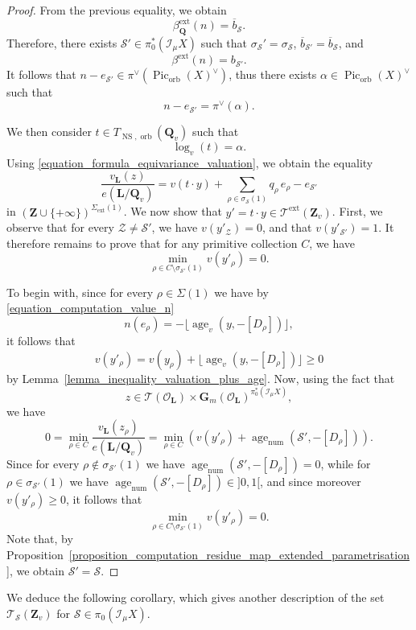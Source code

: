 \documentclass{proc-l}
\newcommand{\Z}{\mathbf{Z}}
\newcommand{\Q}{\mathbf{Q}}
\newcommand{\Le}{\mathbf{L}}
\newcommand{\G}{\mathbf{G}}
\DeclareMathOperator{\Pic}{Pic}
\DeclareMathOperator{\num}{num}
\DeclareMathOperator{\age}{age}
\DeclareMathOperator{\NS}{NS}
\DeclareMathOperator{\orb}{orb}
\DeclareMathOperator{\ext}{ext}
\newcommand{\stackZ}{\mathcal{Z}}
\newcommand{\stackS}{\mathcal{S}}
\newcommand{\stackT}{\mathcal{T}}
\newcommand{\sheafI}{\mathcal{I}}
\newcommand{\sheafO}{\mathcal{O}}
\newcommand{\sector}{\pi_0(\sheafI_{\mu} X)}
\newcommand{\twistsector}{\pi_0^*(\sheafI_{\mu} X)}
\theoremstyle{definition}
\theoremstyle{remark}
\numberwithin{equation}{section}
\begin{document}
\begin{proof}
From the previous equality, we obtain
\[
\beta^{\ext}_{\Q}(n) = \overline b_{\stackS}.
\]
Therefore, there exists $\stackS' \in \twistsector$ such that
$\sigma_\stackS' = \sigma_\stackS$,
$\overline b_{\stackS'} = \overline b_{\stackS}$, and
\[
\beta^{\ext}(n) = b_{\stackS'}.
\]
It follows that $n - e_{\stackS'} \in \pi^{\vee}\left(\Pic_{\orb}(X)^{\vee}\right)$, thus there exists $\alpha \in \Pic_{\orb}(X)^{\vee}$ such that
\[
n - e_{\stackS'} = \pi^{\vee}\left(\alpha\right).
\]

We then consider $t \in T_{\NS,\orb}(\Q_v)$ such that
\[
\log_v(t) = \alpha.
\]
Using \eqref{equation_formula_equivariance_valuation}, we obtain the equality
\[
\frac{v_{\Le}(z)}{e(\Le/\Q_v)}
=
v(t \cdot y)
+
\sum_{\rho \in \sigma_\stackS(1)} q_{\rho}\, e_{\rho}
-
e_{\stackS'}
\]
in $\left( \Z \cup \{+\infty\} \right)^{\Sigma_{\ext}(1)}$. We now show that $y' = t \cdot y \in \stackT^{\ext}(\Z_v)$. First, we observe that for
every $\stackZ \neq \stackS'$, we have $v(y'_{\stackZ}) = 0$, and that
$v(y'_{\stackS'}) = 1$. It therefore remains to prove that for any primitive
collection $C$, we have
\[
\min_{\rho \in C \setminus \sigma_{\stackS'}(1)} v(y'_{\rho}) = 0 .
\]

To begin with, since for every $\rho \in \Sigma(1)$ we have by \eqref{equation_computation_value_n}
\[
n(e_{\rho}) = - \lfloor \age_v(y,-[D_{\rho}]) \rfloor,
\]
it follows that
\[
v(y'_{\rho})
=
v(y_{\rho}) + \lfloor \age_v(y,-[D_{\rho}]) \rfloor
\geqslant 0
\]
by Lemma~\ref{lemma_inequality_valuation_plus_age}. Now, using the fact that
\[
z \in \stackT(\sheafO_{\Le}) \times \G_m(\sheafO_{\Le})^{\twistsector},
\]
we have
\[
0
=
\min_{\rho \in C}
\frac{v_{\Le}(z_{\rho})}{e(\Le/\Q_v)}
=
\min_{\rho \in C}
\left(
v(y'_{\rho}) + \age_{\num}\!\left(\stackS',-[D_{\rho}]\right)
\right).
\]
Since for every $\rho \notin \sigma_{\stackS'}(1)$ we have
$\age_{\num}\!\left(\stackS',-[D_{\rho}]\right) = 0$, while for
$\rho \in \sigma_{\stackS'}(1)$ we have
$\age_{\num}\!\left(\stackS',-[D_{\rho}]\right) \in ]0,1[$, and since moreover
$v(y'_{\rho}) \geqslant 0$, it follows that
\[
\min_{\rho \in C \setminus \sigma_{\stackS'}(1)} v(y'_{\rho}) = 0 .
\]Note that, by Proposition~\ref{proposition_computation_residue_map_extended_parametrisation},
we obtain $\stackS' = \stackS$.

\end{proof}

We deduce the following corollary, which gives another description of the set $\stackT_{\stackS}(\Z_v)$ for $\stackS \in \sector$.
\end{document}
